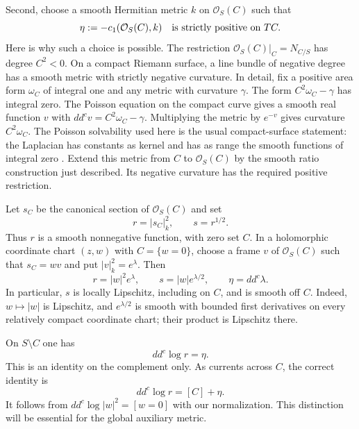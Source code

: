 \documentclass[11pt,a4paper]{article}
\numberwithin{equation}{section}
\theoremstyle{definition}
\theoremstyle{remark}
\newcommand{\OO}{\mathcal O}
\newcommand{\ddc}{dd^{c}}
\newcommand{\cOne}{c_1}
\begin{document}
Second, choose a smooth Hermitian metric $k$ on $\OO_S(C)$ such that
\begin{equation}\label{met:negative-metric}
       \eta:=-\cOne(\OO_S(C),k)
       \quad\hbox{is strictly positive on }TC.
\end{equation}
Here is why such a choice is possible. The restriction
$\OO_S(C)|_C=N_{C/S}$ has degree $C^2<0$. On a compact Riemann surface,
a line bundle of negative degree has a smooth metric with strictly
negative curvature. In detail, fix a positive area form $\omega_C$ of
integral one and any metric with curvature $\gamma$. The form
$C^2\omega_C-\gamma$ has integral zero. The Poisson equation on the
compact curve gives a smooth real function $v$ with
$\ddc v=C^2\omega_C-\gamma$. Multiplying the metric by $e^{-v}$
gives curvature $C^2\omega_C$. The Poisson solvability used here is the
usual compact-surface statement: the Laplacian has constants as kernel
and has as range the smooth functions of integral zero
\cite{DemaillyCADG}. Extend this metric from $C$ to $\OO_S(C)$ by the
smooth ratio construction just described. Its negative curvature has
the required positive restriction.

Let $s_C$ be the canonical section of $\OO_S(C)$ and set
\begin{equation}\label{met:r-s}
                    r=|s_C|_k^2,\qquad s=r^{1/2}.
\end{equation}
Thus $r$ is a smooth nonnegative function, with zero set $C$. In a
holomorphic coordinate chart $(z,w)$ with $C=\{w=0\}$, choose a frame
$v$ of $\OO_S(C)$ such that $s_C=w v$ and put
$|v|_k^2=e^{\lambda}$. Then
\begin{equation}\label{met:r-coordinates}
       r=|w|^2e^{\lambda},\qquad
       s=|w|e^{\lambda/2},\qquad \eta=\ddc\lambda.
\end{equation}
In particular, $s$ is locally Lipschitz, including on $C$, and is smooth
off $C$. Indeed, $w\mapsto|w|$ is Lipschitz, and $e^{\lambda/2}$ is
smooth with bounded first derivatives on every relatively compact
coordinate chart; their product is Lipschitz there.

On $S\setminus C$ one has
\begin{equation}\label{met:log-r}
                       \ddc\log r=\eta.
\end{equation}
This is an identity on the complement only. As currents across $C$,
the correct identity is
\begin{equation}\label{met:PL-r}
                       \ddc\log r=[C]+\eta.
\end{equation}
It follows from $\ddc\log|w|^2=[w=0]$ with our normalization. This
distinction will be essential for the global auxiliary metric.
\end{document}
